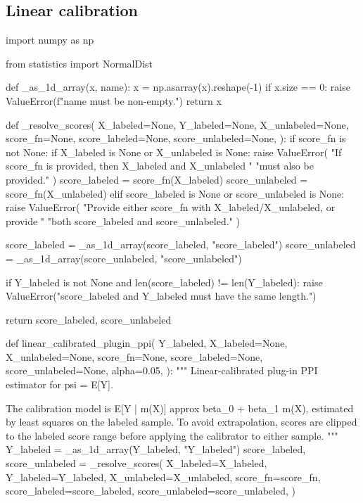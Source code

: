 \documentclass{article}
\theoremstyle{plain}
\theoremstyle{definition}
\newcommand{\1}{\mathbbm{1}}
\begin{document}
\subsection{Linear calibration}
\begin{codeblock}
import numpy as np

from statistics import NormalDist


def _as_1d_array(x, name):
    x = np.asarray(x).reshape(-1)
    if x.size == 0:
        raise ValueError(f"{name} must be non-empty.")
    return x


def _resolve_scores(
    X_labeled=None,
    Y_labeled=None,
    X_unlabeled=None,
    score_fn=None,
    score_labeled=None,
    score_unlabeled=None,
):
    if score_fn is not None:
        if X_labeled is None or X_unlabeled is None:
            raise ValueError(
                "If score_fn is provided, then X_labeled and X_unlabeled "
                "must also be provided."
            )
        score_labeled = score_fn(X_labeled)
        score_unlabeled = score_fn(X_unlabeled)
    elif score_labeled is None or score_unlabeled is None:
        raise ValueError(
            "Provide either score_fn with X_labeled/X_unlabeled, or provide "
            "both score_labeled and score_unlabeled."
        )

    score_labeled = _as_1d_array(score_labeled, "score_labeled")
    score_unlabeled = _as_1d_array(score_unlabeled, "score_unlabeled")

    if Y_labeled is not None and len(score_labeled) != len(Y_labeled):
        raise ValueError("score_labeled and Y_labeled must have the same length.")

    return score_labeled, score_unlabeled


def linear_calibrated_plugin_ppi(
    Y_labeled,
    X_labeled=None,
    X_unlabeled=None,
    score_fn=None,
    score_labeled=None,
    score_unlabeled=None,
    alpha=0.05,
):
    """
    Linear-calibrated plug-in PPI estimator for psi = E[Y].

    The calibration model is
        E[Y | m(X)] approx beta_0 + beta_1 m(X),
    estimated by least squares on the labeled sample. To avoid extrapolation,
    scores are clipped to the labeled score range before applying the
    calibrator to either sample.
    """
    Y_labeled = _as_1d_array(Y_labeled, "Y_labeled")
    score_labeled, score_unlabeled = _resolve_scores(
        X_labeled=X_labeled,
        Y_labeled=Y_labeled,
        X_unlabeled=X_unlabeled,
        score_fn=score_fn,
        score_labeled=score_labeled,
        score_unlabeled=score_unlabeled,
    )


\end{codeblock}
\end{document}
